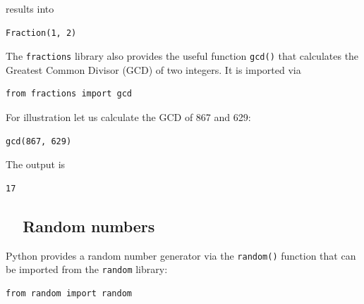 \documentclass[article,A4,12pt]{llncs}
\begin{document}
\noindent
results into\\

\begin{ybox}
\begin{verbatim}
Fraction(1, 2)
\end{verbatim}
\end{ybox}
\vspace{6mm}

\noindent
The {\tt fractions} library also provides the useful function {\tt gcd()} that 
calculates the Greatest Common Divisor (GCD) of two integers. It is imported via \\

\begin{bbox}
\begin{verbatim}
from fractions import gcd
\end{verbatim}
\end{bbox}
\vspace{6mm}

\noindent
For illustration let us calculate the GCD of 867 and 629:\\

\begin{bbox}
\begin{verbatim}
gcd(867, 629)
\end{verbatim}
\end{bbox}
\vspace{6mm}

\noindent
The output is \\

\begin{ybox}
\begin{verbatim}
17
\end{verbatim}
\end{ybox}
\vspace{6mm}

\noindent

\subsection{\ \ Random numbers}

Python provides a random number generator via the {\tt random()} function that 
can be imported from the {\tt random} library:\\

\begin{bbox}
\begin{verbatim}
from random import random
\end{verbatim}
\end{bbox}
\vspace{6mm}
\end{document}
